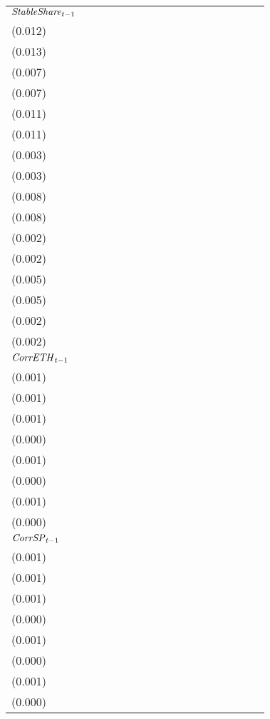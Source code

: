 \begin{tabular}{lllllllllllllllll}
${{\it StableShare}}_{t-1}$  &   \makecell{$0.505^{**}$ \\(0.012)} &   \makecell{$0.506^{**}$ \\(0.013)} &   \makecell{$0.091^{**}$ \\(0.007)} &  \makecell{$0.091^{**}$ \\(0.007)} &  \makecell{$-0.188^{**}$ \\(0.011)} &  \makecell{$-0.187^{**}$ \\(0.011)} &  \makecell{$-0.008^{**}$ \\(0.003)} &  \makecell{$-0.008^{**}$ \\(0.003)} &  \makecell{$-0.170^{**}$ \\(0.008)} &  \makecell{$-0.170^{**}$ \\(0.008)} &  \makecell{$-0.007^{**}$ \\(0.002)} &  \makecell{$-0.007^{**}$ \\(0.002)} &   \makecell{$0.206^{**}$ \\(0.005)} &  \makecell{$0.206^{**}$ \\(0.005)} &  \makecell{$0.023^{**}$ \\(0.002)} &  \makecell{$0.023^{**}$ \\(0.002)} \\
${{\it CorrETH}}_{t-1}$      &  \makecell{$-0.027^{**}$ \\(0.001)} &                                     &  \makecell{$-0.004^{**}$ \\(0.001)} &                                    &    \makecell{$-0.000^{}$ \\(0.001)} &                                     &     \makecell{$0.000^{}$ \\(0.000)} &                                     &    \makecell{$-0.001^{}$ \\(0.001)} &                                     &    \makecell{$-0.000^{}$ \\(0.000)} &                                     &  \makecell{$-0.004^{**}$ \\(0.001)} &                                    &   \makecell{$-0.000^{}$ \\(0.000)} &                                    \\
${{\it CorrSP}}_{t-1}$       &                                     &  \makecell{$-0.016^{**}$ \\(0.001)} &                                     &  \makecell{$-0.002^{*}$ \\(0.001)} &                                     &  \makecell{$-0.007^{**}$ \\(0.001)} &                                     &    \makecell{$-0.000^{}$ \\(0.000)} &                                     &  \makecell{$-0.006^{**}$ \\(0.001)} &                                     &    \makecell{$-0.000^{}$ \\(0.000)} &                                     &    \makecell{$0.001^{}$ \\(0.001)} &                                    &    \makecell{$0.000^{}$ \\(0.000)} \\

\end{tabular}
